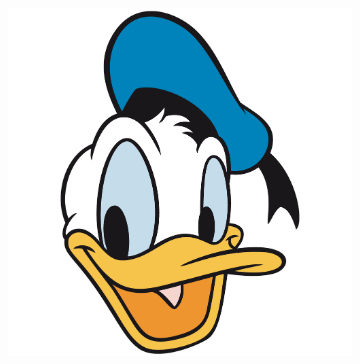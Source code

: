 \begin{figure}[h!]
\begin{subfigure}[b]{0.24\textwidth}
        \includegraphics[width=\textwidth]{fig/stylegan/noface/and}
    \end{subfigure}


\end{figure}
